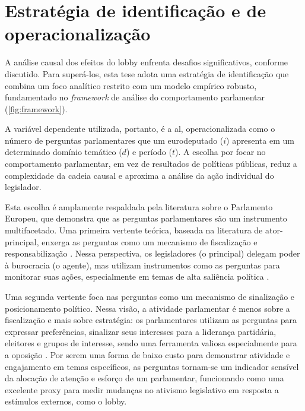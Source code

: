 \section{Estratégia de identificação e de operacionalização}

A análise causal dos efeitos do lobby enfrenta desafios significativos, conforme discutido. Para superá-los, esta tese adota uma estratégia de identificação que combina um foco analítico restrito com um modelo empírico robusto, fundamentado no \textit{framework} de análise do comportamento parlamentar (\ref{fig:framework}).

A variável dependente utilizada, portanto, é a \acrfull{al}, operacionalizada como o número de perguntas parlamentares que um eurodeputado ($i$) apresenta em um determinado domínio temático ($d$) e período ($t$). A escolha por focar no comportamento parlamentar, em vez de resultados de políticas públicas, reduz a complexidade da cadeia causal e aproxima a análise da ação individual do legislador.

Esta escolha é amplamente respaldada pela literatura sobre o Parlamento Europeu, que demonstra que as perguntas parlamentares são um instrumento multifacetado. Uma primeira vertente teórica, baseada na literatura de ator-principal, enxerga as perguntas como um mecanismo de fiscalização e responsabilização \cite{jensen2013parliamentary, maricut2020qa, martin2013parliamentary}. Nessa perspectiva, os legisladores (o principal) delegam poder à burocracia (o agente), mas utilizam instrumentos como as perguntas para monitorar suas ações, especialmente em temas de alta saliência política \cite{mccubbin1984congressional, saalfeld2000members, strom2000delegation, koop2011explaining}. 

Uma segunda vertente foca nas perguntas como um mecanismo de sinalização e posicionamento político. Nessa visão, a atividade parlamentar é menos sobre a fiscalização e mais sobre estratégia: os parlamentares utilizam as perguntas para expressar preferências, sinalizar seus interesses para a liderança partidária, eleitores e grupos de interesse, sendo uma ferramenta valiosa especialmente para a oposição \cite{martin2013parliamentary, otjes2017parliamentary, proksch2010parliamentary, bevan2023do, navarro2022banking}. Por serem uma forma de baixo custo para demonstrar atividade e engajamento em temas específicos, as perguntas tornam-se um indicador sensível da alocação de atenção e esforço de um parlamentar, funcionando como uma excelente proxy para medir mudanças no ativismo legislativo em resposta a estímulos externos, como o lobby.

